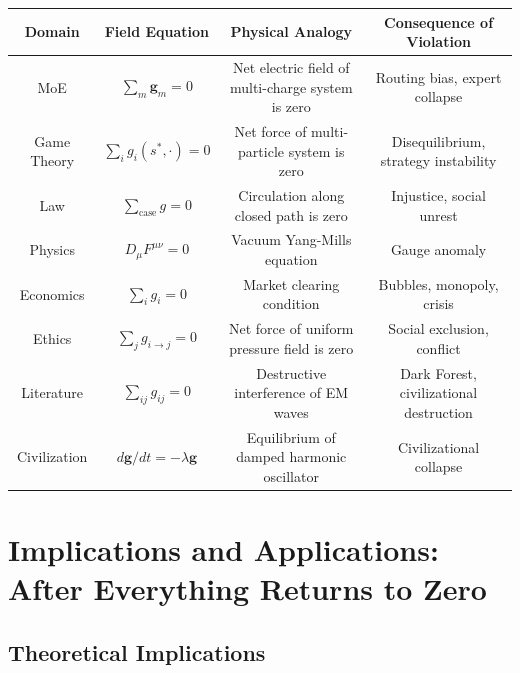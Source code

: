 \documentclass[12pt,a4paper]{article}
\theoremstyle{plain}
\theoremstyle{definition}
\newcommand{\gv}{\mathbf{g}}
\begin{document}
\begin{center}
\begin{tabular}{c|c|c|c}
    \toprule
    \textbf{Domain} & \textbf{Field Equation} & \textbf{Physical Analogy} & \textbf{Consequence of Violation} \\
    \midrule
    MoE & $\sum_m \gv_m = 0$ & Net electric field of multi-charge system is zero & Routing bias, expert collapse \\
    Game Theory & $\sum_i g_i(s^*, \cdot) = 0$ & Net force of multi-particle system is zero & Disequilibrium, strategy instability \\
    Law & $\sum_{\text{case}} g = 0$ & Circulation along closed path is zero & Injustice, social unrest \\
    Physics & $D_\mu F^{\mu\nu} = 0$ & Vacuum Yang-Mills equation & Gauge anomaly \\
    Economics & $\sum_i g_i = 0$ & Market clearing condition & Bubbles, monopoly, crisis \\
    Ethics & $\sum_j g_{i \to j} = 0$ & Net force of uniform pressure field is zero & Social exclusion, conflict \\
    Literature & $\sum_{ij} g_{ij} = 0$ & Destructive interference of EM waves & Dark Forest, civilizational destruction \\
    Civilization & $d\gv/dt = -\lambda \gv$ & Equilibrium of damped harmonic oscillator & Civilizational collapse \\
    \bottomrule
\end{tabular}
\end{center}

\newpage


\section{Implications and Applications: After Everything Returns to Zero}

\subsection{Theoretical Implications}
\end{document}
